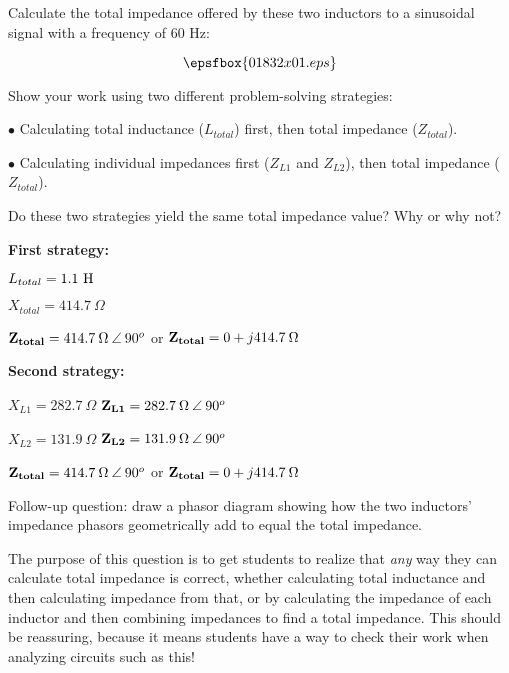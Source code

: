 

Calculate the total impedance offered by these two inductors to a sinusoidal signal with a frequency of 60 Hz:

$$\epsfbox{01832x01.eps}$$

Show your work using two different problem-solving strategies:

\medskip
\item{$\bullet$} Calculating total inductance ($L_{total}$) first, then total impedance ($Z_{total}$).
\item{$\bullet$} Calculating individual impedances first ($Z_{L1}$ and $Z_{L2}$), then total impedance ($Z_{total}$).
\medskip

Do these two strategies yield the same total impedance value?  Why or why not?







\noindent
{\bf First strategy:}

$L_{total} = 1.1 \hbox{ H}$

$X_{total} = 414.7 \> \Omega$

${\bf Z_{total}} = 414.7 \> \Omega \> \angle \> 90^o$ or ${\bf Z_{total}} = 0 + j414.7 \> \Omega$

\vskip 10pt

\goodbreak

\noindent
{\bf Second strategy:}

$X_{L1} = 282.7 \> \Omega$ \hskip 10pt ${\bf Z_{L1}} = 282.7 \> \Omega \> \angle \> 90^o$

$X_{L2} = 131.9 \> \Omega$ \hskip 10pt ${\bf Z_{L2}} = 131.9 \> \Omega \> \angle \> 90^o$

${\bf Z_{total}} = 414.7 \> \Omega \> \angle \> 90^o$ or ${\bf Z_{total}} = 0 + j414.7 \> \Omega$

\vskip 10pt

Follow-up question: draw a phasor diagram showing how the two inductors' impedance phasors geometrically add to equal the total impedance.







The purpose of this question is to get students to realize that {\it any} way they can calculate total impedance is correct, whether calculating total inductance and then calculating impedance from that, or by calculating the impedance of each inductor and then combining impedances to find a total impedance.  This should be reassuring, because it means students have a way to check their work when analyzing circuits such as this!




